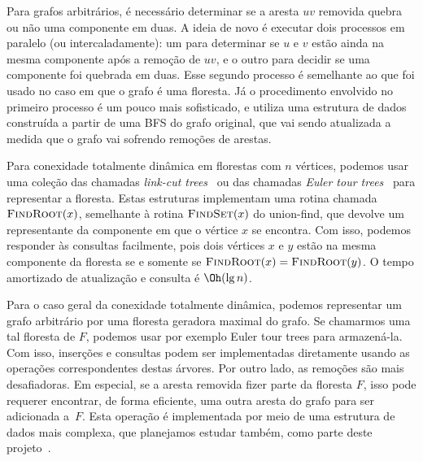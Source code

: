 Para grafos arbitrários, é necessário determinar se a aresta $uv$ removida quebra ou não uma 
componente em duas.  A ideia de novo é executar dois processos em paralelo (ou intercaladamente): 
um para determinar se $u$ e $v$ estão ainda na mesma componente após a remoção de $uv$, e o
outro para decidir se uma componente foi quebrada em duas.  Esse segundo processo é semelhante
ao que foi usado no caso em que o grafo é uma floresta.  Já o procedimento envolvido no 
primeiro processo é um pouco mais sofisticado, e utiliza uma estrutura de dados construída 
a partir de uma BFS do grafo original, que vai sendo atualizada a medida que o grafo vai 
sofrendo remoções de arestas. 

\newcommand{\FindRoot}{\mbox{\sc FindRoot}}
\newcommand{\FindSet}{\mbox{\sc FindSet}}

Para conexidade totalmente dinâmica em florestas com $n$ vértices, 
podemos usar uma coleção das chamadas \emph{link-cut trees}~\cite{SleatorT1983} ou 
das chamadas \emph{Euler tour trees}~\cite{HenzingerK1995} para representar a floresta.  
Estas estruturas implementam uma rotina chamada $\FindRoot(x)$, 
semelhante à rotina $\FindSet(x)$ do union-find, que devolve 
um representante da componente em que o vértice $x$ se encontra. 
Com isso, podemos responder às consultas facilmente, pois dois vértices $x$ e $y$ 
estão na mesma componente da floresta se e somente se $\FindRoot(x) = \FindRoot(y)$.
O tempo amortizado de atualização e consulta é $\Oh(\lg n)$.

Para o caso geral da conexidade totalmente dinâmica, podemos representar um grafo arbitrário  
por uma floresta geradora maximal do grafo.  Se chamarmos uma tal floresta de $F$, podemos 
usar por exemplo Euler tour trees para armazená-la.  Com isso, inserções e consultas 
podem ser implementadas diretamente usando as operações correspondentes destas árvores.  
Por outro lado, as remoções são mais desafiadoras.  Em especial, se a aresta removida fizer
parte da floresta $F$, isso pode requerer encontrar, de forma eficiente, uma outra aresta 
do grafo para ser adicionada a~$F$.  Esta operação é implementada por meio de uma estrutura
de dados mais complexa, que planejamos estudar também, como parte deste projeto~\cite{DemaineL2007}. 